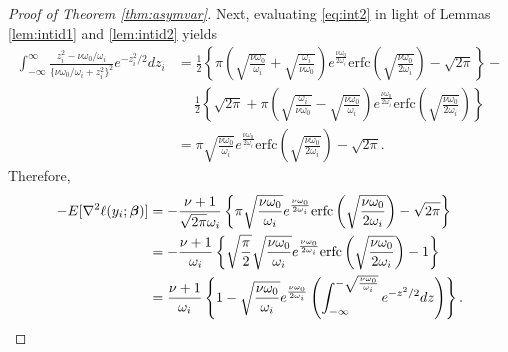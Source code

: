 \documentclass[12pt]{article}
\newcommand{\Exp}[1]{{\rm{E}}[ #1 ]}
\newcommand{\bs}[1]{\boldsymbol #1}
\begin{document}
\begin{proof}[Proof of Theorem \ref{thm:asymvar}]
Next, evaluating \eqref{eq:int2} in light of Lemmas \ref{lem:intid1} and \ref{lem:intid2} yields
\begin{equation*}
    \begin{aligned}
        \int_{-\infty}^\infty \frac{z_i^2 - \nu \omega_0 /\omega_i}{\{\nu \omega_0 / \omega_i + z_i^2\}^2} e^{-z_i^2/2} dz_i &= \frac{1}{2}\left\{\pi \left(\sqrt{\frac{\nu \omega_0}{\omega_i}} + \sqrt{\frac{\omega_i}{\nu \omega_0}} \right) e^{\frac{\nu \omega_0}{2\omega_i}} \mathrm{erfc}\left(\sqrt{\frac{\nu \omega_0}{2\omega_i}} \right) -\sqrt{2\pi} \right\} - \\
        &\quad~\frac{1}{2}\left\{\sqrt{2\pi} + \pi\left(\sqrt{\frac{\omega_i}{\nu \omega_0}}-\sqrt{\frac{\nu \omega_0}{\omega_i}}\right) e^{\frac{\nu \omega_0}{2\omega_i}} \mathrm{erfc}\left(\sqrt{\frac{\nu \omega_0}{2\omega_i}} \right)\right\} \\
        &= \pi \sqrt{\frac{\nu \omega_0}{\omega_i}} e^{\frac{\nu \omega_0}{2\omega_i}} \mathrm{erfc}\left(\sqrt{\frac{\nu \omega_0}{2\omega_i}} \right) - \sqrt{2\pi}.
    \end{aligned}
\end{equation*}
Therefore,
\begin{equation*}
    \begin{aligned}
        -\Exp{ \nabla^2 \ell(y_i ; \bs{\beta}) } &= -\frac{\nu+1}{\sqrt{2\pi} \omega_i} \left\{ \pi \sqrt{\frac{\nu \omega_0}{\omega_i}} e^{\frac{\nu \omega_0}{2\omega_i}} \mathrm{erfc}\left(\sqrt{\frac{\nu \omega_0}{2\omega_i}} \right) - \sqrt{2\pi} \right\} \\
        &= -\frac{\nu+1}{\omega_i} \left\{ \sqrt{\frac{\pi}{2}} \sqrt{\frac{\nu \omega_0}{\omega_i}} e^{\frac{\nu \omega_0}{2\omega_i}} \mathrm{erfc}\left(\sqrt{\frac{\nu \omega_0}{2\omega_i}} \right) - 1 \right\} \\
        &= \frac{\nu+1}{\omega_i} \left\{1-\sqrt{\frac{\nu \omega_0}{\omega_i}} e^{\frac{\nu \omega_0}{2\omega_i}} \left(\int_{-\infty}^{-\sqrt{\frac{\nu \omega_0}{\omega_i}}} e^{-z^2/2} dz \right)\right\}.
    \end{aligned}
\end{equation*}


\end{proof}
\end{document}
